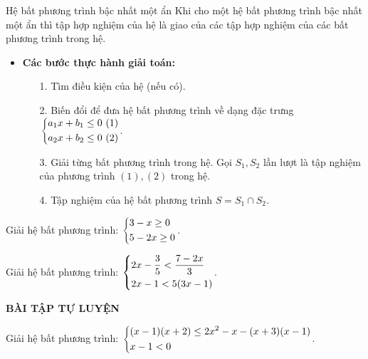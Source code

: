 \begin{dang}{Hệ bất phương trình bậc nhất một ẩn}%
Khi cho một hệ bất phương trình bậc nhất một ẩn thì tập hợp nghiệm của hệ là giao của các tập hợp nghiệm của các bất phương trình trong hệ.
\begin{itemize}
\item \textbf{Các bước thực hành giải toán:}
\begin{enumerate}
\item[1.] Tìm điều kiện của hệ (nếu có).
\item[2.] Biến đổi để đưa hệ bất phương trình về dạng đặc trưng $\heva{&a_1x+b_1\le 0\ (1)\\&a_2x+b_2\le 0\ (2)}$.
\item[3.] Giải từng bất phương trình trong hệ. Gọi $S_1,S_2$ lần lượt là tập nghiệm của phương trình $(1),(2)$ trong hệ.
\item[4.] Tập nghiệm của hệ bất phương trình $S=S_1\cap S_2$. 
\end{enumerate}
\end{itemize}
\end{dang}
\begin{vd}%
Giải hệ bất phương trình: $\left\{\begin{aligned}&3-x\ge 0\\&5-2x\ge 0\end{aligned}\right.$. 
\loigiai{
Ta có: $\heva{&3-x\ge 0\\&5-2x\ge 0}\Leftrightarrow \heva{&x\le 3\\&x\le \dfrac{5}{2}}\Leftrightarrow x\le\dfrac{5}{2}$.\\
Tập nghiệm của hệ bất phương trình $S=\left(-\infty;\dfrac{5}{2}\right]$.
}
\end{vd}
\begin{vd}%
Giải hệ bất phương trình: $\left\{\begin{aligned}&2x-\dfrac{3}{5}<\dfrac{7-2x}{3}\\&2x-1<5(3x-1)\end{aligned}\right.$.
\end{vd}
\begin{center}
\textbf{BÀI TẬP TỰ LUYỆN}
\end{center}
\begin{bt}%
Giải hệ bất phương trình: $\left\{\begin{aligned}&(x-1)(x+2)\le 2x^2-x-(x+3)(x-1)\\&x-1<0\end{aligned}\right.$.
\end{bt}
